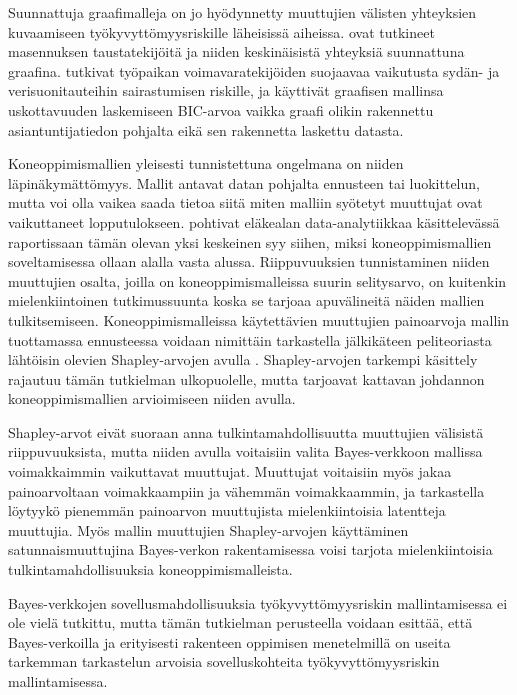 Suunnattuja graafimalleja on jo hyödynnetty muuttujien välisten yhteyksien kuvaamiseen työkyvyttömyysriskille läheisissä aiheissa. \citet{elovainio_is_2021, elovainio_network_2020} ovat tutkineet masennuksen taustatekijöitä ja niiden keskinäisistä yhteyksiä suunnattuna graafina. \citet{xu_workplace_2022} tutkivat työpaikan voimavaratekijöiden suojaavaa vaikutusta sydän- ja verisuonitauteihin sairastumisen riskille, ja käyttivät graafisen mallinsa uskottavuuden laskemiseen BIC-arvoa vaikka graafi olikin rakennettu asiantuntijatiedon pohjalta eikä sen rakennetta laskettu datasta.

Koneoppimismallien yleisesti tunnistettuna ongelmana on niiden läpinäkymättömyys. Mallit antavat datan pohjalta ennusteen tai luokittelun, mutta voi olla vaikea saada tietoa siitä miten malliin syötetyt muuttujat ovat vaikuttaneet lopputulokseen. \citet{adekunle_applied_2021} pohtivat eläkealan data-analytiikkaa käsittelevässä raportissaan tämän olevan yksi keskeinen syy siihen, miksi koneoppimismallien soveltamisessa ollaan alalla vasta alussa. Riippuvuuksien tunnistaminen niiden muuttujien osalta, joilla on koneoppimismalleissa suurin selitysarvo, on kuitenkin mielenkiintoinen tutkimussuunta koska se tarjoaa apuvälineitä näiden mallien tulkitsemiseen. Koneoppimismalleissa käytettävien muuttujien painoarvoja mallin tuottamassa ennusteessa voidaan nimittäin tarkastella jälkikäteen peliteoriasta lähtöisin olevien Shapley-arvojen avulla \citep{shapley_7_2020}. Shapley-arvojen tarkempi käsittely rajautuu tämän tutkielman ulkopuolelle, mutta \citet{merrick_explanation_2020} tarjoavat kattavan johdannon koneoppimismallien arvioimiseen niiden avulla. 

Shapley-arvot eivät suoraan anna tulkintamahdollisuutta muuttujien välisistä riippuvuuksista, mutta niiden avulla voitaisiin valita Bayes-verkkoon mallissa voimakkaimmin vaikuttavat muuttujat. Muuttujat voitaisiin myös jakaa painoarvoltaan voimakkaampiin ja vähemmän voimakkaammin, ja tarkastella löytyykö pienemmän painoarvon muuttujista mielenkiintoisia latentteja muuttujia. Myös mallin muuttujien Shapley-arvojen käyttäminen satunnaismuuttujina Bayes-verkon rakentamisessa voisi tarjota mielenkiintoisia tulkintamahdollisuuksia koneoppimismalleista.

Bayes-verkkojen sovellusmahdollisuuksia työkyvyttömyysriskin mallintamisessa ei ole vielä tutkittu, mutta tämän tutkielman perusteella voidaan esittää, että Bayes-verkoilla ja erityisesti rakenteen oppimisen menetelmillä on useita tarkemman tarkastelun arvoisia sovelluskohteita työkyvyttömyysriskin mallintamisessa. 